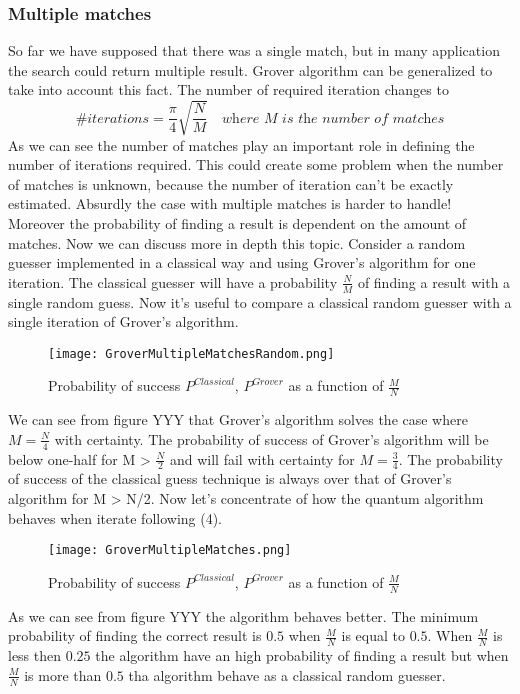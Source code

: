 \documentclass[main.tex]{subfiles}
\theoremstyle{definition}
\begin{document}
\subsubsection{Multiple matches}
So far we have supposed that there was a single match, but in many application the search could return multiple result. Grover algorithm can be generalized to take into account this fact.
The number of required iteration changes to
\begin{equation}
\textit{\# iterations}=\frac{\pi}{4}\sqrt{\frac{N}{M}}\quad\textit{where M is the number of matches}
\end{equation}
As we can see the number of matches play an important role in defining the number of iterations required. This could create some problem when the number of matches is unknown, because the number of iteration can't be exactly estimated. Absurdly the case with multiple matches is harder to handle! Moreover the probability of finding a result is dependent on the amount of matches.
Now we can discuss more in depth this topic.
Consider a random guesser implemented in a classical way and using Grover's algorithm for one iteration. The classical guesser will have a probability $\frac{N}{M}$ of finding a result with a single random guess. Now it's useful to compare a classical random guesser with a single iteration of Grover's algorithm.

\begin{figure}[h]
	\centering
	\texttt{[image: GroverMultipleMatchesRandom.png]}
	\caption{Probability of success $P^{Classical}$, $P^{Grover}$ as a function of $\frac{M}{N}$}
\end{figure}

We can see from figure YYY that Grover’s algorithm solves the case where $M = \frac{N}{4}$ with certainty.
The probability of success of Grover’s algorithm will be below one-half for M > $\frac{N}{2}$ and will fail
with certainty for $M = \frac{3}{4}$. The probability of success of the classical guess technique is always over that of Grover’s algorithm for M > N/2.
Now let's concentrate of how the quantum algorithm behaves when iterate following (4).

\begin{figure}[h]
	\centering
	\texttt{[image: GroverMultipleMatches.png]}
	\caption{Probability of success $P^{Classical}$, $P^{Grover}$ as a function of $\frac{M}{N}$}
\end{figure}

As we can see from figure YYY the algorithm behaves better. The minimum probability of finding the correct result is $0.5$ when $\frac{M}{N}$ is equal to $0.5$. When $\frac{M}{N}$ is less then $0.25$ the algorithm have an high probability of finding a result but when $\frac{M}{N}$ is more than $0.5$ tha algorithm behave as a classical random guesser.
\end{document}
